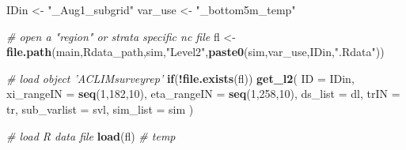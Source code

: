 \documentclass[
]{article}
\newenvironment{Shaded}{\begin{snugshade}}{\end{snugshade}}
\newcommand{\CommentTok}[1]{\textcolor[rgb]{0.56,0.35,0.01}{\textit{#1}}}
\newcommand{\ControlFlowTok}[1]{\textcolor[rgb]{0.13,0.29,0.53}{\textbf{#1}}}
\newcommand{\DataTypeTok}[1]{\textcolor[rgb]{0.13,0.29,0.53}{#1}}
\newcommand{\DecValTok}[1]{\textcolor[rgb]{0.00,0.00,0.81}{#1}}
\newcommand{\KeywordTok}[1]{\textcolor[rgb]{0.13,0.29,0.53}{\textbf{#1}}}
\newcommand{\NormalTok}[1]{#1}
\newcommand{\OperatorTok}[1]{\textcolor[rgb]{0.81,0.36,0.00}{\textbf{#1}}}
\newcommand{\StringTok}[1]{\textcolor[rgb]{0.31,0.60,0.02}{#1}}
\begin{document}
\begin{Shaded}
\begin{Highlighting}[]
\NormalTok{    IDin       <-}\StringTok{ "_Aug1_subgrid"}
\NormalTok{    var_use    <-}\StringTok{ "_bottom5m_temp"}
    
    \CommentTok{# open a "region" or strata specific nc file}
\NormalTok{    fl         <-}\StringTok{ }\KeywordTok{file.path}\NormalTok{(main,Rdata_path,sim,}\StringTok{"Level2"}\NormalTok{,}\KeywordTok{paste0}\NormalTok{(sim,var_use,IDin,}\StringTok{".Rdata"}\NormalTok{))}
    
    \CommentTok{# load object 'ACLIMsurveyrep'}
    \ControlFlowTok{if}\NormalTok{(}\OperatorTok{!}\KeywordTok{file.exists}\NormalTok{(fl))}
      \KeywordTok{get_l2}\NormalTok{(}
        \DataTypeTok{ID          =}\NormalTok{ IDin,}
        \DataTypeTok{xi_rangeIN  =} \KeywordTok{seq}\NormalTok{(}\DecValTok{1}\NormalTok{,}\DecValTok{182}\NormalTok{,}\DecValTok{10}\NormalTok{),}
        \DataTypeTok{eta_rangeIN =} \KeywordTok{seq}\NormalTok{(}\DecValTok{1}\NormalTok{,}\DecValTok{258}\NormalTok{,}\DecValTok{10}\NormalTok{),}
        \DataTypeTok{ds_list     =}\NormalTok{ dl,}
        \DataTypeTok{trIN        =}\NormalTok{ tr,}
        \DataTypeTok{sub_varlist =}\NormalTok{ svl,  }
        \DataTypeTok{sim_list    =}\NormalTok{ sim  )}
    
    \CommentTok{# load R data file}
    \KeywordTok{load}\NormalTok{(fl)   }\CommentTok{# temp}
    

\end{Highlighting}
\end{Shaded}
\end{document}

